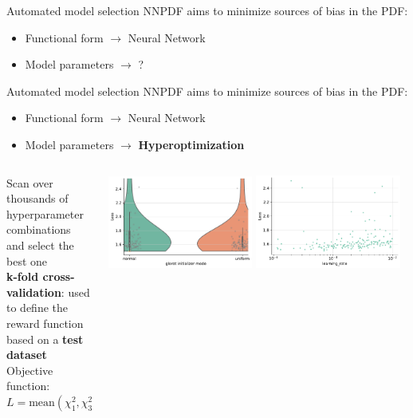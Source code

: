 \documentclass[aspectratio=169,9pt]{beamer}
\begin{document}
\begin{frame}[t]{Automated model selection}
	NNPDF aims to minimize sources of bias in the PDF:
	\begin{itemize}
	    \item Functional form $\rightarrow$ Neural Network
	    \item Model parameters $\rightarrow$ ?
	\end{itemize}
\end{frame}


\begin{frame}[t]{Automated model selection}
	NNPDF aims to minimize sources of bias in the PDF:
	\begin{itemize}
	    \item Functional form $\rightarrow$ Neural Network
	    \item Model parameters $\rightarrow$ \textbf{Hyperoptimization}
	\end{itemize}
    \begin{columns}
        \begin{column}{0.48\textwidth}
            Scan over thousands of hyperparameter combinations and select the best one \\
            \vspace*{0.8em}
            {\bf k-fold cross-validation}: used to define the reward function based on a {\bf test dataset}\\ 
            \vspace*{0.8em}
            Objective function: \\
            $L=\textrm{mean}(\chi_1^2,\chi_3^2,\chi_2^2,\ldots, \chi_k^2)$
        \end{column}
        \begin{column}{0.48\textwidth}
            \begin{center}
                \includegraphics[width=0.48\textwidth]{sec_methodology_hyperopt_plot_initializer.pdf}
                \includegraphics[width=0.48\textwidth]{sec_methodology_hyperopt_plot_lr.pdf} \\

\end{center}
\end{column}
\end{columns}
\end{frame}
\end{document}
